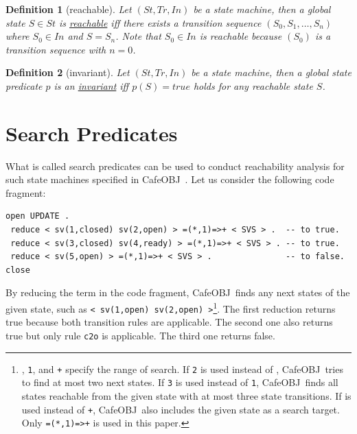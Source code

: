 \documentclass[12pt]{report}
\newtheorem{definition}{Definition}
\newcommand{\stt}[1]{{\small{\tt {#1}}}}
\newcommand{\ul}{\underline}
\newcommand{\cafeobj}{{\sf CafeOBJ}~}
\begin{document}
\begin{definition}[reachable]
  Let $(St,Tr,In)$ be a state machine, then a global state $S\in St$
  is \ul{reachable} iff there exists a transition sequence
  $(S_0,S_1,\dots,S_n)$ where $S_0\in In$ and $S=S_n$. Note that $S_0\in
  In$ is reachable because $(S_0)$ is a transition sequence with $n=0$.
\end{definition}
\begin{definition}[invariant]
  Let $(St,Tr,In)$ be a state machine, then a global state predicate
  $p$ is an \ul{invariant} iff $p(S)=true$ holds for any reachable
  state $S$.
\end{definition}

\section{Search Predicates}
\label{sec:searchpredicate}
What is called search predicates can be used to conduct
reachability analysis for such state machines specified in
\cafeobj. Let us consider the following code fragment:
\begin{verbatim}
open UPDATE .
 reduce < sv(1,closed) sv(2,open) > =(*,1)=>+ < SVS > .  -- to true.
 reduce < sv(3,closed) sv(4,ready) > =(*,1)=>+ < SVS > . -- to true.
 reduce < sv(5,open) > =(*,1)=>+ < SVS > .               -- to false.
close
\end{verbatim}
By reducing the term in the code fragment, \cafeobj finds any next
states of the given state, such as
\stt{<~sv(1,open)~sv(2,open)~>}\footnote{{\tt *}, {\tt 1}, and {\tt +}
  specify the range of search. If {\tt 2} is used instead of {\tt *},
  \cafeobj tries to find at most two next states. If {\tt 3} is used
  instead of {\tt 1}, \cafeobj finds all states reachable from the
  given state with at most three state transitions. If {\tt *} is used
  instead of {\tt +}, \cafeobj also includes the given state as a
  search target.  Only \stt{=(*,1)=>+} is used in this paper.}.  The
first reduction returns true because both transition rules are
applicable.  The second one also returns true but only rule {\tt c2o}
is applicable. The third one returns false.
\end{document}
